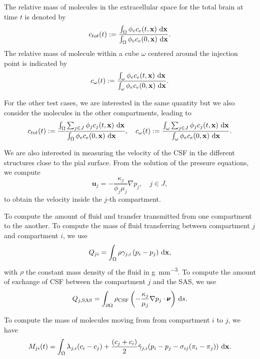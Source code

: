 \documentclass[10pt,letterpaper]{article}
\newcommand{\1}{^{(1)}}
\newcommand{\2}{^{(2)}}
\newcommand*{\dd}{\mathop{\kern0pt\mathrm{d}}\!{}}
\newcommand {\x}   {\mathbf{x}}
\begin{document}
The relative mass of molecules in the extracellular space for the total brain at time $t$ is denoted by 
\[
c_{tot}(t) := \frac{\int_\Omega \phi_e c_e(t,\x) \, \dd \x }{ \int_\Omega \phi_e c_e(0,\x) \, \dd \x}.
\]
The relative mass of molecule within a cube $\omega$ centered around the injection point is indicated by 
\[
c_{\omega}(t) :=  \frac{\int_{\omega}  \phi_e c_e(t,\x) \, \dd \x }{\int_\omega  \phi_e c_e(0,\x) \, \dd \x}.  
\]

For the other test cases, we are interested in the same quantity but we also consider the molecules in the other compartments, leading to 
\[
c_{tot}(t) := \frac{\int_\Omega \sum_{j\in J}  \phi_j c_j(t,\x) \, \dd \x }{ \int_\Omega \phi_e c_e(0,\x) \, \dd \x}, \quad c_{\omega}(t) := \frac{\int_{\omega} \sum_{j\in J} \phi_j c_j(t,\x) \, \dd \x }{ \int_\omega \phi_e c_e(0,\x) \, \dd \x}.  
\]

We are also interested in measuring the velocity of the CSF in the different structures close to the pial surface.
From the solution of the pressure equations, we compute 
\begin{equation}
    \mathbf u_j = -\frac{\kappa_j}{\phi_j \mu_j}\nabla p_j, \quad j\in J, 
    \label{eq:velo}
\end{equation}
to obtain the velocity inside the $j$-th compartment. 

To compute the amount of fluid and transfer transmitted from one compartment to the another. To compute the mass of fluid transferring between compartment $j$ and compartment $i$, we use
\begin{equation}
Q_{ji} = \int_{\Omega} \rho \gamma_{j , i} \left( p_i - p_j \right)\, \dd \x,  
\label{eq:compute-transfer}
\end{equation}
with $\rho$ the constant mass density of the fluid in \si{g.mm^{-3}}. 
To compute the amount of exchange of CSF between the compartment $j$ and the SAS, we use 
\begin{equation}
Q_{j,\text{SAS}} = \int_{\partial \Omega} \rho_\text{CSF} \left(- \frac{\kappa_j}{ \mu_j}\nabla p_j  \cdot\pmb{\nu}\right) \,\dd s.\label{eq:compute-transfer-SAS}
\end{equation}


To compute the mass of molecules moving from from compartment $i$ to $j$, we have 
\begin{equation}
    M_{ji}(t) = \int_\Omega  \lambda_{j, i}( c_i- c_j) +  \frac{(c_j+c_i)}{2} \tilde \gamma_{j , i} (p_i - p_j-\sigma_{ij}(\pi_i-\pi_j))  \, \dd \x.
    \label{eq:matrixM}
\end{equation}
\end{document}
